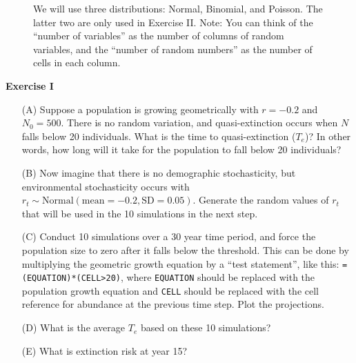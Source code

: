 \documentclass[12pt]{article}\usepackage[]{graphicx}\usepackage[]{xcolor}
\begin{document}
\vspace{1cm}

\begin{figure}[h]
  \centering
  \caption{\footnotesize We will use three distributions: Normal,
    Binomial, and Poisson. The latter two are only used in Exercise
    II. Note: You can think of the ``number of variables'' as the
    number of columns of random variables, and the ``number of random
    numbers'' as the number of cells in each column.
  }
  \label{fig:rng-3}
\end{figure}


\clearpage



{\bf Exercise I \\}
\begin{enumerate}
  \item[(A)] Suppose a population is growing geometrically with
    $r=-0.2$ and $N_0=500$. There is no random variation, and
    quasi-extinction occurs when $N$ falls below 20 individuals.
    What is the time to quasi-extinction ($T_e$)? In other words, how
    long will it take for the population to fall below 20 individuals?
  \item[(B)] Now imagine that there is no demographic stochasticity,
    but environmental stochasticity occurs with $r_t \sim
    \mathrm{Normal}(\mathrm{mean}=-0.2, \mathrm{SD}=0.05)$. Generate
    the random values of $r_t$ that will be  
    used in the 10 simulations in the next step.
  \item[(C)] Conduct 10 simulations over a 30 year time period, and force
    the population size to zero after it falls below the threshold.
    This can be done by multiplying the geometric
    growth equation by a ``test statement'', like this:
    {\tt =(EQUATION)*(CELL>20)}, where {\tt EQUATION} should be
    replaced with the population growth equation and {\tt CELL} should
    be replaced with the cell reference for abundance at the previous
    time step. Plot the projections.
  \item[(D)] What is the average $T_e$ based on these 10 simulations?
  \item[(E)] What is extinction risk at year 15?
\end{enumerate}
\end{document}
